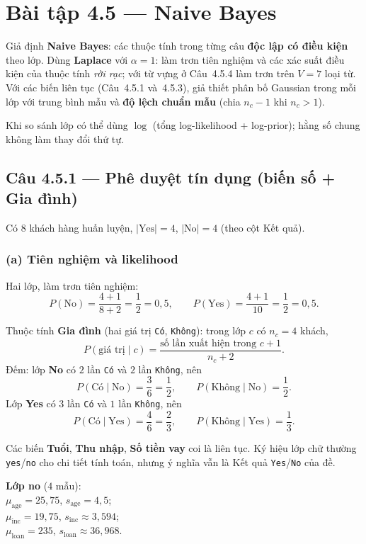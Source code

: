 \section*{Bài tập 4.5 --- Naive Bayes}

Giả định \textbf{Naive Bayes}: các thuộc tính trong từng câu \textbf{độc lập có điều kiện} theo lớp. Dùng \textbf{Laplace} với \(\alpha=1\): làm trơn tiên nghiệm và các xác suất điều kiện của thuộc tính \emph{rời rạc}; với từ vựng ở Câu~4.5.4 làm trơn trên \(V=7\) loại từ. Với các biến liên tục (Câu~4.5.1 và~4.5.3), giả thiết phân bố Gaussian trong mỗi lớp với trung bình mẫu và \textbf{độ lệch chuẩn mẫu} (chia \(n_c-1\) khi \(n_c>1\)).

Khi so sánh lớp có thể dùng \(\log\) (tổng log-likelihood + log-prior); hằng số chung không làm thay đổi thứ tự.

\subsection*{Câu 4.5.1 --- Phê duyệt tín dụng (biến số + Gia đình)}

Có \(8\) khách hàng huấn luyện, \(|\text{Yes}|=4\), \(|\text{No}|=4\) (theo cột Kết quả).

\subsubsection*{(a) Tiên nghiệm và likelihood}

Hai lớp, làm trơn tiên nghiệm:
\[
P(\text{No})=\frac{4+1}{8+2}=\frac12=0{,}5,\qquad
P(\text{Yes})=\frac{4+1}{10}=\frac12=0{,}5.
\]

Thuộc tính \textbf{Gia đình} (hai giá trị \texttt{Có}, \texttt{Không}): trong lớp \(c\) có \(n_c=4\) khách,
\[
P(\text{giá trị}\mid c)=\frac{\text{số lần xuất hiện trong }c+1}{n_c+2}.
\]
Đếm: lớp \textbf{No} có \(2\) lần \texttt{Có} và \(2\) lần \texttt{Không}, nên
\[
P(\text{Có}\mid\text{No})=\frac{3}{6}=\frac12,\qquad
P(\text{Không}\mid\text{No})=\frac12.
\]
Lớp \textbf{Yes} có \(3\) lần \texttt{Có} và \(1\) lần \texttt{Không}, nên
\[
P(\text{Có}\mid\text{Yes})=\frac{4}{6}=\frac23,\qquad
P(\text{Không}\mid\text{Yes})=\frac13.
\]

Các biến \textbf{Tuổi}, \textbf{Thu nhập}, \textbf{Số tiền vay} coi là liên tục. Ký hiệu lớp chữ thường \texttt{yes}/\texttt{no} cho chi tiết tính toán, nhưng ý nghĩa vẫn là Kết quả \texttt{Yes}/\texttt{No} của đề.

\medskip
\noindent\textbf{Lớp no} (\(4\) mẫu): \\
\(\mu_{\text{age}}=25{,}75\), \(s_{\text{age}}=4{,}5\); \\
\(\mu_{\text{inc}}=19{,}75\), \(s_{\text{inc}}\approx 3{,}594\); \\
\(\mu_{\text{loan}}=235\), \(s_{\text{loan}}\approx 36{,}968\).

